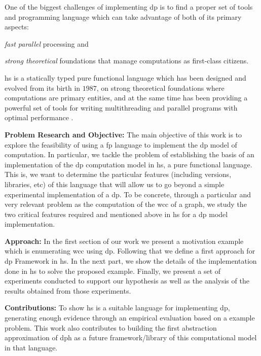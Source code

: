 \documentclass[preprint]{elsarticle}
\begin{document}
One of the biggest challenges of implementing \acrshort{dp} is to find a proper set of tools and programming language which can take advantage of both of its primary aspects: \begin{inparaenum}[i\upshape)]
\item  \emph{fast parallel} processing and 
\item  \emph{strong theoretical} foundations that manage computations as first-class citizens.
 \end{inparaenum}
\acrfull{hs} is a statically typed pure functional language which has been designed and evolved from its birth in $1987$, on strong theoretical foundations where computations are primary entities, and at the same time has been providing a powerful set of tools for writing multithreading and parallel programs with optimal performance \cite{parallelbook, monadpar}.

\textbf{Problem Research and Objective:}\label{research:obj} The main objective of this work is to explore the feasibility of using a  \acrfull{fp} language to implement the \acrshort{dp} model of computation. In particular, we tackle the problem of establishing the basis of an implementation of the \acrshort{dp} computation model in \acrshort{hs}, a pure functional language. This is,  we want to determine the particular features (including versions, libraries, etc) of this language that will allow us to go beyond a simple experimental implementation of a \acrshort{dp}. To be concrete, through a particular and very relevant problem as the computation of the \acrfull{wcc} of a graph,  we study the two critical features required and mentioned above in \acrshort{hs} for a \acrshort{dp} model implementation.

\textbf{Approach:} In the first section of our work we present a motivation example which is enumerating \acrshort{wcc} using \acrshort{dp}. Following that we define a first approach for \acrshort{dp} Framework in \acrshort{hs}.
In the next part, we show the details of the implementation done in \acrshort{hs} to solve the proposed example. Finally, we present a set of experiments conducted to support our hypothesis as well as the analysis of the results obtained from those experiments.

\textbf{Contributions:} To show \acrshort{hs} is a suitable language for implementing \acrshort{dp}, generating enough evidence through an empirical evaluation based on a example problem. This work also contributes to building the first abstraction approximation of \acrshort{dph} as a future framework/library of this computational model in that language. 
\end{document}
